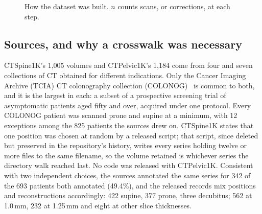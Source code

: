 \documentclass[aapm,mph,amsmath,amssymb,reprint]{revtex4-2}
\begin{document}
\begin{figure}[t]
\caption{How the dataset was built. $n$ counts scans, or corrections, at each step.}
\label{fig:pipeline}
\end{figure}

\subsection{Sources, and why a crosswalk was necessary}\label{sec:sources}
CTSpine1K's 1{,}005 volumes and CTPelvic1K's 1{,}184 come from four and seven collections of
CT obtained for different indications. Only the Cancer Imaging Archive (TCIA) CT colonography
collection (COLONOG)~\cite{colonog,tcia} is common to both, and it is the largest in each: a
subset of a prospective screening trial of asymptomatic patients aged fifty and over, acquired
under one protocol. Every COLONOG patient was scanned prone and supine at a minimum, with 12
exceptions among the 825 patients the sources drew on. CTSpine1K states that one position was
chosen at random by a released script; that script, since deleted but preserved in the
repository's history, writes every series holding twelve or more files to the same filename,
so the volume retained is whichever series the directory walk reached last. No code was
released with CTPelvic1K. Consistent with two independent choices, the sources annotated the
same series for 342 of the 693 patients both annotated (49.4\%), and the released records mix
positions and reconstructions accordingly: 422 supine, 377 prone, three decubitus; 562 at
1.0\,mm, 232 at 1.25\,mm and eight at other slice thicknesses.
\end{document}
